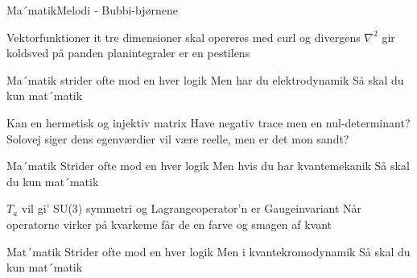 \begin{sang}{Ma´matik}{Melodi - Bubbi-bjørnene}
\begin{vers}
Vektorfunktioner it tre dimensioner
skal opereres med curl og divergens
$\nabla^{2}$ gir koldsved på panden
planintegraler er en pestilens
\end{vers}
\begin{vers}
Ma´matik
strider ofte mod en hver logik
Men har du elektrodynamik
Så skal du kun mat´matik
\end{vers}
\begin{vers}
Kan en hermetisk og injektiv matrix
Have negativ trace men en nul-determinant?
Solovej siger dens egenværdier
vil være reelle, men er det mon sandt?
\end{vers}
\vbox{}\vfill
\begin{vers}
Ma´matik
Strider ofte mod en hver logik
Men hvis du har kvantemekanik
Så skal du kun mat´matik
\end{vers}
\begin{vers}
$T_{a}$ vil gi' SU(3) symmetri
og Lagrangeoperator'n er Gaugeinvariant
Når operatorne virker på kvarkeme
får de en farve og smagen af kvant
\end{vers}
\begin{vers}
Mat´matik
Strider ofte mod en hver logik
Men i kvantekromodynamik
Så skal du kun mat´matik
\end{vers}
\laps
\end{sang}
